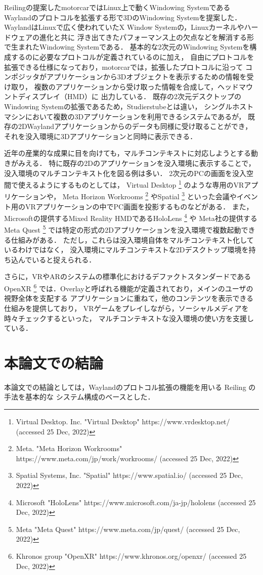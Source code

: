 Reilingの提案したmotorcar\cite{reiling}ではLinux上で動くWindowing Systemである
Waylandのプロトコルを拡張する形で3DのWindowing Systemを提案した．
WaylandはLinuxで広く使われていたX Window Systemの，Linuxカーネルやハードウェアの進化と共に
浮き出てきたパフォーマンス上の欠点などを解消する形で生まれたWindowing Systemである．
基本的な2次元のWindowing Systemを構成するのに必要なプロトコルが定義されているのに加え，
自由にプロトコルを拡張できる仕様になっており，motorcarでは，拡張したプロトコルに沿って
コンポジッタがアプリケーションから3Dオブジェクトを表示するための情報を受け取り，
複数のアプリケーションから受け取った情報を合成して，ヘッドマウントディスプレイ（HMD）に
出力している．
既存の2次元デスクトップのWindowing Systemの拡張であるため，Studierstubeとは違い，
シングルホストマシンにおいて複数の3Dアプリケーションを利用できるシステムであるが，
既存の2DWaylandアプリケーションからのデータも同様に受け取ることができ，
それを没入環境に3Dアプリケーションと同時に表示できる．

近年の産業的な成果に目を向けても，マルチコンテキストに対応しようとする動きがみえる．
特に既存の2Dのアプリケーションを没入環境に表示することで，
没入環境のマルチコンテキスト化を図る例は多い．
2次元のPCの画面を没入空間で使えるようにするものとしては，
Virtual Desktop
\footnote{Virtual Desktop. Inc. "Virtual Desktop" https://www.vrdesktop.net/ (accessed 25 Dec, 2022)}
のような専用のVRアプリケーションや，
Meta Horizon Workrooms
\footnote{Meta. "Meta Horizon Workrooms" https://www.meta.com/jp/work/workrooms/ (accessed 25 Dec, 2022)}
やSpatial
\footnote{Spatial Systems, Inc. "Spatial" https://www.spatial.io/ (accessed 25 Dec, 2022)}
といった会議やイベント用のVRアプリケーションの中でPC画面を投影するものなどがある．
また，Microsoftの提供するMixed Reality HMDであるHoloLens
\footnote{Microsoft "HoloLens" https://www.microsoft.com/ja-jp/hololens (accessed 25 Dec, 2022)}
や Meta社の提供するMeta Quest
\footnote{Meta "Meta Quest" https://www.meta.com/jp/quest/ (accessed 25 Dec, 2022)}
では特定の形式の2Dアプリケーションを没入環境で複数起動できる仕組みがある．
ただし，これらは没入環境自体をマルチコンテキスト化しているわけではなく，
没入環境にマルチコンテキストな2Dデスクトップ環境を持ち込んでいると捉えられる．

さらに，VRやARのシステムの標準化におけるデファクトスタンダードであるOpenXR
\footnote{Khronos group "OpenXR" https://www.khronos.org/openxr/ (accessed 25 Dec, 2022)}
では．Overlayと呼ばれる機能が定義されており，メインのユーザの視野全体を支配する
アプリケーションに重ねて，他のコンテンツを表示できる仕組みを提供しており，
VRゲームをプレイしながら，ソーシャルメディアを時々チェックするといった，
マルチコンテキストな没入環境の使い方を支援している．

\section{本論文での結論}
\label{section:overview:conclusion}

本論文での結論としては，Waylandのプロトコル拡張の機能を用いる Reiling の手法を基本的な
システム構成のベースとした．

